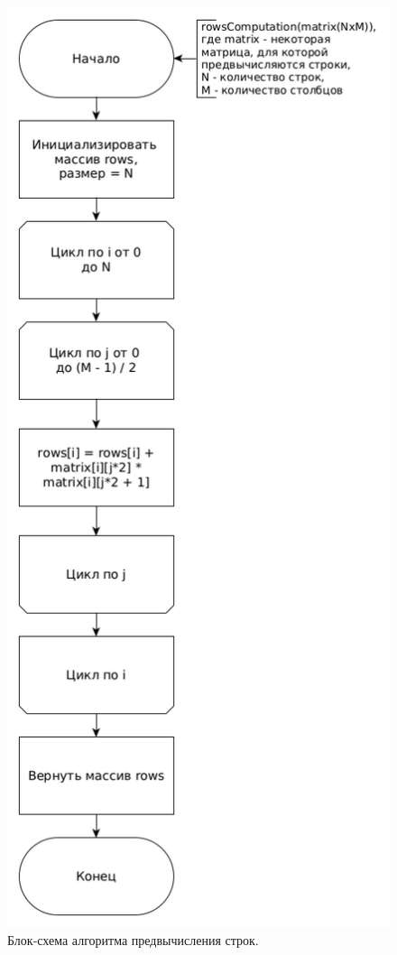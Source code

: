 \documentclass[12pt]{report}
\begin{document}
\begin{figure}
\begin{center}
\includegraphics[scale=0.33]{inc/img/rowsComp.png}
\captionsetup{justification=centering}
	\caption{Блок-схема алгоритма предвычисления строк.}
	\label{img:rows}	
\end{center}
\end{figure}
\end{document}

